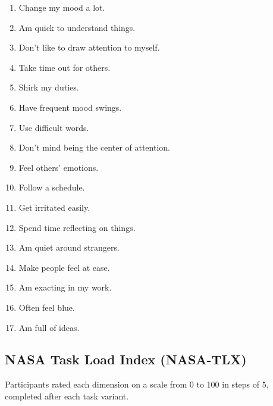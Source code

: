 \begin{enumerate}
    \item Change my mood a lot.
    \item Am quick to understand things.
    \item Don't like to draw attention to myself.
    \item Take time out for others.
    \item Shirk my duties.
    \item Have frequent mood swings.
    \item Use difficult words.
    \item Don't mind being the center of attention.
    \item Feel others' emotions.
    \item Follow a schedule.
    \item Get irritated easily.
    \item Spend time reflecting on things.
    \item Am quiet around strangers.
    \item Make people feel at ease.
    \item Am exacting in my work.
    \item Often feel blue.
    \item Am full of ideas.
\end{enumerate}

\subsection{NASA Task Load Index (NASA-TLX)}
\label{appendix:nasa-tlx}

Participants rated each dimension on a scale from 0 to 100 in steps of 5, completed after each task variant.

